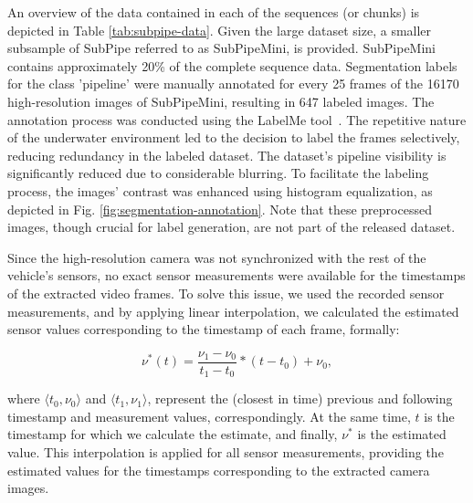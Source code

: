 An overview of the data contained in each of the sequences (or chunks) is depicted in Table \ref{tab:subpipe-data}. Given the large dataset size, a smaller subsample of SubPipe referred to as SubPipeMini, is provided.
SubPipeMini contains approximately 20\% of the complete sequence data. Segmentation labels for the class 'pipeline' were manually annotated for every 25 frames of the 16170 high-resolution images of SubPipeMini, resulting in 647 labeled images. The annotation process was conducted using the LabelMe tool~\cite{Wada_Labelme_Image_Polygonal}. The repetitive nature of the underwater environment led to the decision to label the frames selectively, reducing redundancy in the labeled dataset.
The dataset's pipeline visibility is significantly reduced due to considerable blurring. To facilitate the labeling process, the images' contrast was enhanced using histogram equalization, as depicted in Fig. \ref{fig:segmentation-annotation}. Note that these preprocessed images, though crucial for label generation, are not part of the released dataset. 


Since the high-resolution camera was not synchronized with the rest of the vehicle's sensors, no exact sensor measurements were available for the timestamps of the extracted video frames. To solve this issue, we used the recorded sensor measurements, and by applying linear interpolation, we calculated the estimated sensor values corresponding to the timestamp of each frame, formally:

\begin{equation}
    \nu^{*}(t) = \frac{\nu_1 - \nu_0}{t_1 - t_0} * (t - t_0) + \nu_0,
\end{equation}

\noindent where $\langle t_0, \nu_0 \rangle$ and $\langle t_1, \nu_1 \rangle$, represent the (closest in time) previous and following timestamp and measurement values, correspondingly. At the same time, $t$ is the timestamp for which we calculate the estimate, and finally, $\nu^{*}$ is the estimated value. This interpolation is applied for all sensor measurements, providing the estimated values for the timestamps corresponding to the extracted camera images.





